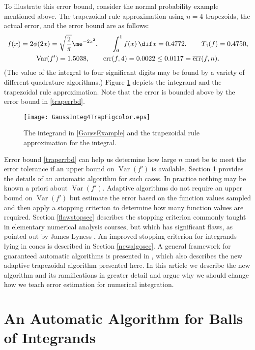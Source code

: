 \documentclass[]{amsart}
\DeclareMathOperator{\Var}{Var}
\DeclareMathOperator{\err}{err}
\newcommand{\oerr}{\overline{\err}}
\theoremstyle{definition}
\theoremstyle{remark}
\begin{document}
To illustrate this error bound, consider the normal probability example mentioned above.  The trapezoidal rule approximation using $n=4$ trapezoids, the actual error, and the error bound are as follows:
\begin{subequations} \label{GaussExample}
\begin{gather}
f(x) = 2\phi(2x) = \sqrt{\frac{2}{\pi}} \me^{-2x^2}, \qquad \int_0^1 f(x)  \, \dif x = 0.4772, \qquad T_{4}(f)= 0.4750, \\
\Var(f') = 1.5038, \qquad \err(f,4)=0.0022 \le 0.0117 = \oerr(f,n).
\end{gather}
\end{subequations}
(The value of the integral to four significant digits may be found by a variety of different quadrature algorithms.)  Figure \ref{Gausstrapfig} depicts the integrand and the trapezoidal rule approximation. Note that the error is bounded above by the error bound in \eqref{traperrbd}.

\begin{figure}
\centering 
\texttt{[image: GaussInteg4TrapFigcolor.eps]}
\caption{The integrand in \eqref{GaussExample} and the trapezoidal rule approximation for the integral. \label{Gausstrapfig}}
\end{figure}

Error bound \eqref{traperrbd} can help us determine how large $n$ must be to meet the error tolerance if an upper bound on $\Var(f')$ is available. Section \ref{autoballsec} provides the details of an automatic algorithm for such cases.  In practice nothing may be known a priori about $\Var(f')$. Adaptive algorithms do not require an upper bound on $\Var(f')$ but estimate the error based on the function values sampled and then apply a stopping criterion to determine how many function values are required.  Section \ref{flawstopsec} describes the stopping criterion commonly taught in elementary numerical analysis courses, but which has significant flaws, as pointed out by James Lyness .  An improved stopping criterion for integrands lying in cones is described in Section \ref{newalgosec}.  A general framework for guaranteed automatic algorithms is presented in , which also describes the new adaptive trapezoidal algorithm presented here.  In this article we describe the new algorithm and its ramifications in greater detail and argue why we should change how we teach error estimation for numerical integration. 


\section{An Automatic Algorithm for Balls of Integrands} \label{autoballsec}
\end{document}
